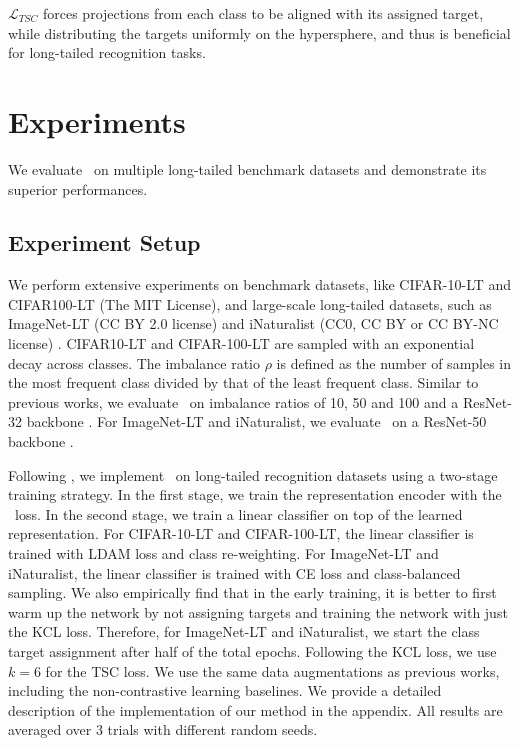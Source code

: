 $\mathcal{L}_{TSC}$ forces projections from each class to be aligned with its assigned target, while distributing the targets uniformly on the hypersphere, and thus is  beneficial for long-tailed recognition tasks. 

\section{Experiments}
\label{sec:results}

We evaluate \name~on multiple long-tailed benchmark datasets and demonstrate its superior performances.

\subsection{Experiment Setup}
\label{subsec:setup}
We perform extensive experiments on benchmark datasets, like CIFAR-10-LT and CIFAR100-LT (The MIT License), and large-scale long-tailed datasets, such as ImageNet-LT (CC BY 2.0 license) \cite{liu2019large} and iNaturalist (CC0, CC BY or CC BY-NC license) \cite{van2018inaturalist}.  CIFAR10-LT and CIFAR-100-LT are sampled with an exponential decay across classes. The imbalance ratio $\rho$ is defined as the number of samples in the most frequent class divided by that of the least frequent class. Similar to previous works, we evaluate \name~on imbalance ratios of 10, 50 and 100 and a ResNet-32 backbone \cite{yang2020rethinking}. For ImageNet-LT and iNaturalist, we evaluate \name\ on a ResNet-50 backbone \cite{kang2020exploring,kang2019decoupling,wang2020long}.

Following \cite{kang2019decoupling, kang2020exploring}, we implement \name~on long-tailed recognition datasets using a two-stage training strategy. In the first stage, we train the representation encoder with the \name~loss. In the second stage, we train a linear classifier on top of the learned representation. For CIFAR-10-LT and CIFAR-100-LT, the linear classifier is trained with LDAM loss and class re-weighting. For ImageNet-LT and iNaturalist, the linear classifier is trained with CE loss and class-balanced sampling. We also empirically find that in the early training, it is better to first warm up the network by not assigning targets and training the network with just the KCL loss. Therefore, for ImageNet-LT and iNaturalist, we start the class target assignment after half of the total epochs. Following the KCL loss, we use $k=6$ for the TSC loss. We use the same data augmentations as previous works, including the non-contrastive learning baselines. We provide a detailed description of the implementation of our method in the appendix. All results are averaged over 3 trials with different random seeds.

